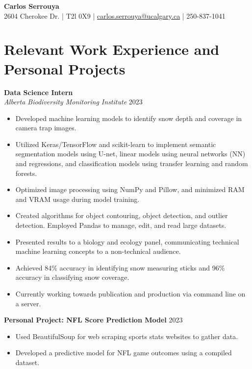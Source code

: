 \documentclass[a4paper,10pt]{article}
\begin{document}
\begin{center}
    {\LARGE \textbf{Carlos Serrouya}} \\
    2604 Cherokee Dr. | T2l 0X9 | \href{mailto:carlos.serrouya@ucalgary.ca}{carlos.serrouya@ucalgary.ca} | 250-837-1041 \\
\end{center}

\vspace{0.2cm}

\section*{Relevant Work Experience and Personal Projects}

\textbf{Data Science Intern} \\
\textit{Alberta Biodiversity Monitoring Institute} \hfill 2023
\begin{itemize}[leftmargin=0.5cm]
    \item Developed machine learning models to identify snow depth and coverage in camera trap images.
    \item Utilized Keras/TensorFlow and scikit-learn to implement semantic segmentation models using U-net, linear models using neural networks (NN) and regressions, and classification models using transfer learning and random forests.
    \item Optimized image processing using NumPy and Pillow, and minimized RAM and VRAM usage during model training.
    \item Created algorithms for object contouring, object detection, and outlier detection. Employed Pandas to manage, edit, and read large datasets.
    \item Presented results to a biology and ecology panel, communicating technical machine learning concepts to a non-technical audience.
    \item Achieved 84\% accuracy in identifying snow measuring sticks and 96\% accuracy in classifying snow coverage.
    \item Currently working towards publication and production via command line on a server.
\end{itemize}

\textbf{Personal Project: NFL Score Prediction Model} \hfill 2023
\begin{itemize}[leftmargin=0.5cm]
    \item Used BeautifulSoup for web scraping sports stats websites to gather data.
    \item Developed a predictive model for NFL game outcomes using a compiled dataset.
\end{itemize}
\end{document}
